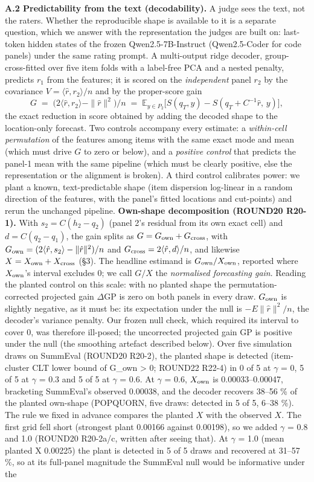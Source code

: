 \documentclass{article}
\begin{document}
\textbf{A.2 Predictability from the text (decodability).} A judge sees the text, not the raters. Whether the reproducible shape is available to it is a separate question, which we answer with the representation the judges are built on: last-token hidden states of the frozen Qwen2.5-7B-Instruct (Qwen2.5-Coder for code panels) under the same rating prompt. A multi-output ridge decoder, group-cross-fitted over five item folds with a label-free PCA and a nested penalty, predicts \(r_1\) from the features; it is scored on the \emph{independent} panel \(r_2\) by the covariance \(V=\langle\hat r,r_2\rangle/n\) and by the proper-score gain \[G \;=\; \big(2\langle \hat r, r_2\rangle - \|\hat r\|^2\big)/n \;=\; \mathbb E_{y\in P_2}\big[S(q_T,y) - S(q_T + C^{-1}\hat r,\,y)\big],\] the exact reduction in score obtained by adding the decoded shape to the location-only forecast. Two controls accompany every estimate: a \emph{within-cell permutation} of the features among items with the same exact mode and mean (which must drive \(G\) to zero or below), and a \emph{positive control} that predicts the panel-1 mean with the same pipeline (which must be clearly positive, else the representation or the alignment is broken). A third control calibrates power: we plant a known, text-predictable shape (item dispersion log-linear in a random direction of the features, with the panel's fitted locations and cut-points) and rerun the unchanged pipeline. \textbf{Own-shape decomposition (ROUND20 R20-1).} With \(s_2=C(h_2-q_2)\) (panel 2's residual from its own exact cell) and \(d=C(q_2-q_1)\), the gain splits as \(G=G_{\rm own}+G_{\rm cross}\), with \(G_{\rm own}=(2\langle\hat r,s_2\rangle-\|\hat r\|^2)/n\) and \(G_{\rm cross}=2\langle\hat r,d\rangle/n\), and likewise \(X=X_{\rm own}+X_{\rm cross}\) (\S{}3). The headline estimand is \(G_{\rm own}/X_{\rm own}\), reported where \(X_{\rm own}\)'s interval excludes 0; we call \(G/X\) the \emph{normalised forecasting gain}. Reading the planted control on this scale: with no planted shape the permutation-corrected projected gain $\Delta$GP is zero on both panels in every draw. \(G_{\rm own}\) is slightly negative, as it must be: its expectation under the null is \(-E\|\hat r\|^2/n\), the decoder's variance penalty. Our frozen null check, which required its interval to cover 0, was therefore ill-posed; the uncorrected projected gain GP is positive under the null (the smoothing artefact described below). Over five simulation draws on SummEval (ROUND20 R20-2), the planted shape is detected (item-cluster CLT lower bound of G\_own \textgreater{} 0; ROUND22 R22-4) in 0 of 5 at $\gamma$ = 0, 5 of 5 at $\gamma$ = 0.3 and 5 of 5 at $\gamma$ = 0.6. At $\gamma$ = 0.6, \(X_{\rm own}\) is 0.00033--0.00047, bracketing SummEval's observed 0.00038, and the decoder recovers 38--56 \% of the planted own-shape (POPQUORN, five draws: detected in 5 of 5, 6--38 \%). The rule we fixed in advance compares the planted \(X\) with the observed \(X\). The first grid fell short (strongest plant 0.00166 against 0.00198), so we added $\gamma$ = 0.8 and 1.0 (ROUND20 R20-2a/c, written after seeing that). At $\gamma$ = 1.0 (mean planted X 0.00225) the plant is detected in 5 of 5 draws and recovered at 31--57 \%, so at its full-panel magnitude the SummEval null would be informative under the 
\end{document}
